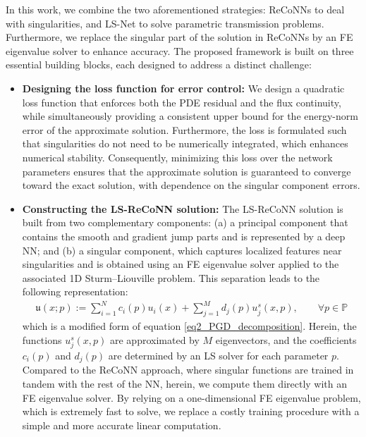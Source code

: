\documentclass[oneside]{article}
\begin{document}
In this work, we combine the two aforementioned strategies: ReCoNNs \cite{taylor2024regularity} to deal with singularities, and LS-Net \cite{baharlouei2024least} to solve parametric transmission problems. Furthermore, we replace the singular part of the solution in ReCoNNs by an FE eigenvalue solver to enhance accuracy. The proposed framework is built on three essential building blocks, each designed to address a distinct challenge:
\begin{itemize}
    \item \textbf{Designing the loss function for error control:} We design a quadratic loss function that enforces both the PDE residual and the flux continuity, while simultaneously providing a consistent upper bound for the energy-norm error of the approximate solution. Furthermore, the loss is formulated such that singularities do not need to be numerically integrated, which enhances numerical stability. Consequently,  minimizing this loss over the network parameters ensures that the approximate solution is guaranteed to converge toward the exact solution, with dependence on the singular component errors.
    
    \item 
    \textbf{Constructing the LS-ReCoNN solution:} The LS-ReCoNN solution is built from two complementary components: (a) a principal component that contains the smooth and gradient jump parts and is represented by a deep NN; and (b) a singular component, which captures localized features near singularities and is obtained using an FE eigenvalue solver applied to the associated 1D Sturm–Liouville problem. This separation leads to the following representation:
    \begin{align}
    \mathfrak{u}(x ; p) := \sum _{i = 1}^N c_i(p) {u}_i(x) + \sum _{j = 1}^M d_j(p) u^s_j(x, p),
    \qquad \forall p \in \mathbb{P}
    \label{eq2_LSReCoNN_decomposition}
    \end{align}
    which is a modified form of equation \eqref{eq2_PGD_decomposition}. 
    Herein, the functions $u^s_j(x, p)$ are approximated by $M$ eigenvectors, and the coefficients $c_i(p)$ and $d_j(p)$ are determined by an LS solver for each parameter $p$. Compared to the ReCoNN approach, where singular functions are trained in tandem with the rest of the NN, herein, we compute them directly with an FE eigenvalue solver. By relying on a one-dimensional FE eigenvalue problem, which is extremely fast to solve, we replace a costly training procedure with a simple and more accurate linear computation.


\end{itemize}
\end{document}
